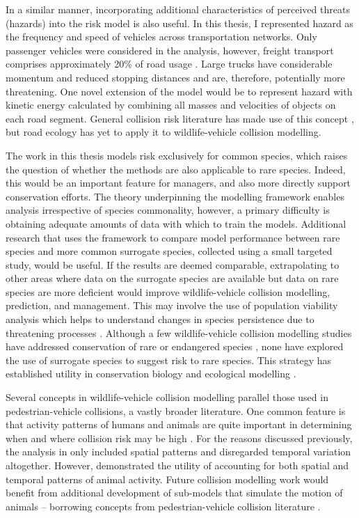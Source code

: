 In a similar manner, incorporating additional characteristics of perceived threats (hazards) into the risk model is also useful. In this thesis, I represented hazard as the frequency and speed of vehicles across transportation networks. Only passenger vehicles were considered in the analysis, however, freight transport comprises approximately 20\% of road usage \citep{abs16}. Large trucks have considerable momentum and reduced stopping distances and are, therefore, potentially more threatening. One novel extension of the model would be to represent hazard with kinetic energy calculated by combining all masses and velocities of objects on each road segment. General collision risk literature has made use of this concept \citep{aart06}, but road ecology has yet to apply it to wildlife-vehicle collision modelling.

The work in this thesis models risk exclusively for common species, which raises the question of whether the methods are also applicable to rare species. Indeed, this would be an important feature for managers, and also more directly support conservation efforts. The theory underpinning the modelling framework enables analysis irrespective of species commonality, however, a primary difficulty is obtaining adequate amounts of data with which to train the models. Additional research that uses the framework to compare model performance between rare species and more common surrogate species, collected using a small targeted study, would be useful. If the results are deemed comparable, extrapolating to other areas where data on the surrogate species are available but data on rare species are more deficient would improve wildlife-vehicle collision modelling, prediction, and management. This may involve the use of population viability analysis which helps to understand changes in species persistence due to threatening processes \citep{rhod14}. Although a few wildlife-vehicle collision modelling studies have addressed conservation of rare or endangered species \citep{dwye16}, none have explored the use of surrogate species to suggest risk to rare species. This strategy has established utility in conservation biology \citep{caro99} and ecological modelling \citep{weng08}.

Several concepts in wildlife-vehicle collision modelling parallel those used in pedestrian-vehicle collisions, a vastly broader literature. One common feature is that activity patterns of humans and animals are quite important in determining when and where collision risk may be high \citep{mira11,lao11}. For the reasons discussed previously, the analysis in  only included spatial patterns and disregarded temporal variation altogether. However,  demonstrated the utility of accounting for both spatial and temporal patterns of animal activity. Future collision modelling work would benefit from additional development of sub-models that simulate the motion of animals \citep[see][]{jaar07} -- borrowing concepts from pedestrian-vehicle collision literature \citep[see][]{lohn10}.

